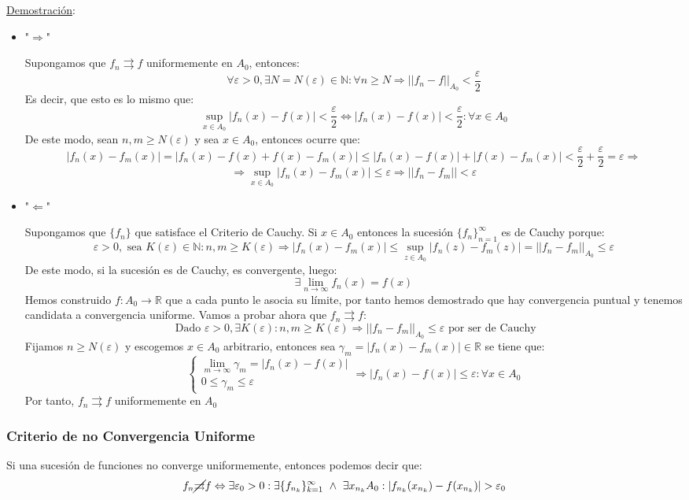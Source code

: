 \documentclass[10pt,a4paper,openright]{book}
\begin{document}
\underline{Demostración}:
\begin{itemize}
\item "$\Rightarrow$"

Supongamos que $f_n \rightrightarrows f$ uniformemente en $A_0$, entonces:
$$\forall \varepsilon > 0, \exists N = N(\varepsilon) \in \mathbb{N} : \forall n \geq N \Rightarrow ||f_n - f|| _{A_0}< \frac{\varepsilon}{2} $$
Es decir, que esto es lo mismo que:
$$\underset{x \in A_0}{\sup} |f_n (x) - f(x)| < \frac{\varepsilon}{2} \Leftrightarrow |f_n (x) - f(x)| < \frac{\varepsilon}{2} : \forall x \in A_0 $$
De este modo, sean $n,m \geq N(\varepsilon)$ y sea $x \in A_0$, entonces ocurre que:
$$|f_n(x) - f_m(x) | = |f_n(x) - f(x) + f(x) - f_m(x) | \leq |f_n (x) - f(x)| + |f(x) - f_m(x)| < \frac{\varepsilon}{2} + \frac{\varepsilon}{2} = \varepsilon \Rightarrow$$
$$\Rightarrow \underset{x \in A_0}{\sup} |f_n (x) - f_m(x)| \leq \varepsilon \Rightarrow ||f_n - f_m || < \varepsilon$$

\item "$\Leftarrow$"

Supongamos que $\{f_n\}$ que satisface el Criterio de Cauchy. Si $x \in A_0$ entonces la sucesión $\{f_n\}_{n=1}^\infty $ es de Cauchy porque:
$$\varepsilon > 0, \mbox{ sea } K(\varepsilon) \in \mathbb{N} : n,m\geq K(\varepsilon) \Rightarrow |f_n (x) - f_m(x)| \leq  \underset{z \in A_0}{\sup} |f_n (z) - f_m(z)| = ||f_n - f_m ||_{A_0} \leq \varepsilon $$
De este modo, si la sucesión es de Cauchy, es convergente, luego:
$$\exists \lim_{n \to \infty} f_n(x) = f(x)$$
Hemos construido $f: A_0 \to \mathbb{R}$ que a cada punto le asocia su límite, por tanto hemos demostrado que hay convergencia puntual y tenemos candidata a convergencia uniforme. Vamos a probar ahora que $f_n \rightrightarrows f$:
$$\mbox{ Dado } \varepsilon > 0, \exists K (\varepsilon) : n,m \geq K(\varepsilon) \Rightarrow ||f_n - f_m ||_{A_0} \leq \varepsilon \mbox{ por ser de Cauchy} $$
Fijamos $n \geq N(\varepsilon) $ y escogemos $x \in A_0$ arbitrario, entonces sea $\gamma_m = |f_n (x) - f_m(x)| \in \mathbb{R}$ se tiene que:
$$\begin{cases}\lim_{m \to \infty} \gamma_m = |f_n (x) - f(x)| \\ 0  \leq \gamma_m \leq \varepsilon \end{cases} \Rightarrow |f_n (x) - f(x)| \leq \varepsilon : \forall x \in A_0$$
Por tanto, $f_n \rightrightarrows f$ uniformemente en $A_0$
\end{itemize}

\subsubsection*{Criterio de no Convergencia Uniforme}
Si una sucesión de funciones no converge uniformemente, entonces podemos decir que:
$$f_n\cancel{\rightrightarrows} f \Leftrightarrow \exists \varepsilon_0 > 0 : \exists \{f_{n_k}\}_{k=1}^\infty\  \wedge \ \exists x_{n_k} A_0: |f_{n_k} (x_{n_k}) - f(x_{n_k}) | > \varepsilon_0$$
\end{document}
